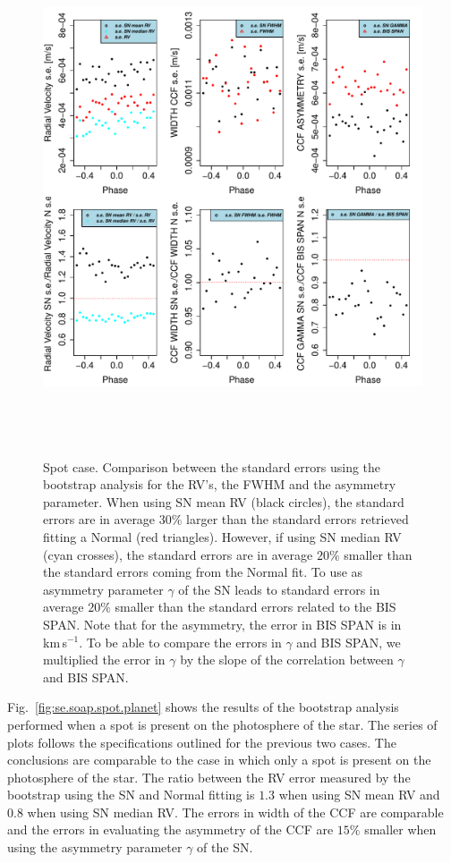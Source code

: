 \documentclass[11pt, oneside]{article}
\def\kms{\hbox{\,km\,s$^{-1}$}}       %
\begin{document}
\begin{figure}[htbp]
   \centering
\includegraphics[height = 6in]{RV_comparison_SPOT_standard_errors.pdf} 
   \caption{Spot case. Comparison between the standard errors using the bootstrap analysis for the RV's, the FWHM and the asymmetry parameter. When using SN mean RV (black circles), the standard errors are in average $30\%$ larger than the standard errors retrieved fitting a Normal (red triangles). However, if using SN median RV (cyan crosses), the standard errors are in average $20\%$ smaller than the standard errors coming from the Normal fit. To use as asymmetry parameter $\gamma$ of the SN leads to standard errors in average $20\%$ smaller than the standard errors related to the BIS SPAN. Note that for the asymmetry, the error in BIS SPAN is in \kms. To be able to compare the errors in $\gamma$ and BIS SPAN, we multiplied the error in $\gamma$ by the slope of the correlation between $\gamma$ and BIS SPAN.}
   \label{fig:se.soap.spot}
\end{figure}

Fig.~\ref{fig:se.soap.spot.planet} shows the results of the bootstrap analysis performed when a spot is present on the photosphere of the star. The series of plots follows the specifications outlined for the previous two cases. The conclusions are comparable to the case in which only a spot is present on the photosphere of the star. The ratio between the RV error measured by the bootstrap using the SN and Normal fitting is $1.3$ when using SN mean RV and $0.8$ when using SN median RV. The errors in width of the CCF are comparable and the errors in evaluating the asymmetry of the CCF are $15\%$ smaller when using the asymmetry parameter $\gamma$ of the SN.
\end{document}
